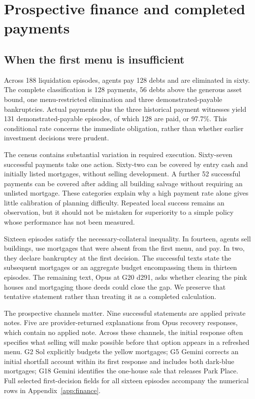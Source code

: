 \section{Prospective finance and completed payments}
\label{sec:finance}
\subsection{When the first menu is insufficient}
Across 188 liquidation episodes, agents pay 128 debts and are eliminated in sixty. The complete classification is 128 payments, 56 debts above the generous asset bound, one menu-restricted elimination and three demonstrated-payable bankruptcies. Actual payments plus the three historical payment witnesses yield 131 demonstrated-payable episodes, of which 128 are paid, or 97.7\%. This conditional rate concerns the immediate obligation, rather than whether earlier investment decisions were prudent.

The census contains substantial variation in required execution. Sixty-seven successful payments take one action. Sixty-two can be covered by entry cash and initially listed mortgages, without selling development. A further 52 successful payments can be covered after adding all building salvage without requiring an unlisted mortgage. These categories explain why a high payment rate alone gives little calibration of planning difficulty. Repeated local success remains an observation, but it should not be mistaken for superiority to a simple policy whose performance has not been measured.

Sixteen episodes satisfy the necessary-collateral inequality. In fourteen, agents sell buildings, use mortgages that were absent from the first menu, and pay. In two, they declare bankruptcy at the first decision. The successful texts state the subsequent mortgages or an aggregate budget encompassing them in thirteen episodes. The remaining text, Opus at G20 d291, asks whether clearing the pink houses and mortgaging those deeds could close the gap. We preserve that tentative statement rather than treating it as a completed calculation.

The prospective channels matter. Nine successful statements are applied private notes. Five are provider-returned explanations from Opus recovery responses, which contain no applied note. Across these channels, the initial response often specifies what selling will make possible before that option appears in a refreshed menu. G2 Sol explicitly budgets the yellow mortgages; G5 Gemini corrects an initial shortfall account within its first response and includes both dark-blue mortgages; G18 Gemini identifies the one-house sale that releases Park Place. Full selected first-decision fields for all sixteen episodes accompany the numerical rows in Appendix~\ref{app:finance}.

